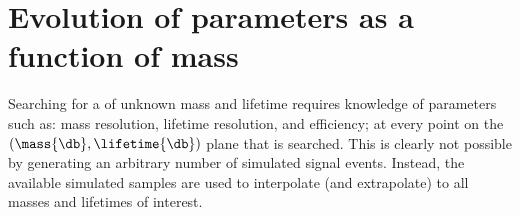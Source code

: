 \section{Evolution of parameters as a function of mass}
\label{sec:param}

Searching for a \db of unknown mass and lifetime requires knowledge of parameters such as: mass
resolution, lifetime resolution, and efficiency; at every point on the
$(\mass{\db}, \lifetime{\db})$ plane that is searched.
This is clearly not possible by generating an arbitrary number of simulated signal events.
Instead, the available simulated samples are used to interpolate (and extrapolate) to all masses
and lifetimes of interest.





